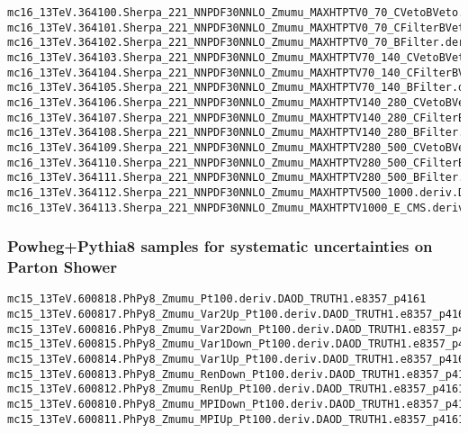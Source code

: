 \begin{tiny}
\begin{verbatim}
mc16_13TeV.364100.Sherpa_221_NNPDF30NNLO_Zmumu_MAXHTPTV0_70_CVetoBVeto.deriv.DAOD_STDM7.e5271_s3126_r10724_p4357
mc16_13TeV.364101.Sherpa_221_NNPDF30NNLO_Zmumu_MAXHTPTV0_70_CFilterBVeto.deriv.DAOD_STDM7.e5271_s3126_r10724_p4357
mc16_13TeV.364102.Sherpa_221_NNPDF30NNLO_Zmumu_MAXHTPTV0_70_BFilter.deriv.DAOD_STDM7.e5271_s3126_r10724_p4357
mc16_13TeV.364103.Sherpa_221_NNPDF30NNLO_Zmumu_MAXHTPTV70_140_CVetoBVeto.deriv.DAOD_STDM7.e5271_s3126_r10724_p4357
mc16_13TeV.364104.Sherpa_221_NNPDF30NNLO_Zmumu_MAXHTPTV70_140_CFilterBVeto.deriv.DAOD_STDM7.e5271_s3126_r10724_p4357
mc16_13TeV.364105.Sherpa_221_NNPDF30NNLO_Zmumu_MAXHTPTV70_140_BFilter.deriv.DAOD_STDM7.e5271_s3126_r10724_p4357
mc16_13TeV.364106.Sherpa_221_NNPDF30NNLO_Zmumu_MAXHTPTV140_280_CVetoBVeto.deriv.DAOD_STDM7.e5271_s3126_r10724_p4357
mc16_13TeV.364107.Sherpa_221_NNPDF30NNLO_Zmumu_MAXHTPTV140_280_CFilterBVeto.deriv.DAOD_STDM7.e5271_s3126_r10724_p4357
mc16_13TeV.364108.Sherpa_221_NNPDF30NNLO_Zmumu_MAXHTPTV140_280_BFilter.deriv.DAOD_STDM7.e5271_s3126_r10724_p4357
mc16_13TeV.364109.Sherpa_221_NNPDF30NNLO_Zmumu_MAXHTPTV280_500_CVetoBVeto.deriv.DAOD_STDM7.e5271_s3126_r10724_p4357
mc16_13TeV.364110.Sherpa_221_NNPDF30NNLO_Zmumu_MAXHTPTV280_500_CFilterBVeto.deriv.DAOD_STDM7.e5271_s3126_r10724_p4357
mc16_13TeV.364111.Sherpa_221_NNPDF30NNLO_Zmumu_MAXHTPTV280_500_BFilter.deriv.DAOD_STDM7.e5271_s3126_r10724_p4357
mc16_13TeV.364112.Sherpa_221_NNPDF30NNLO_Zmumu_MAXHTPTV500_1000.deriv.DAOD_STDM7.e5271_s3126_r10724_p4357
mc16_13TeV.364113.Sherpa_221_NNPDF30NNLO_Zmumu_MAXHTPTV1000_E_CMS.deriv.DAOD_STDM7.e5271_s3126_r10724_p4357
\end{verbatim}
\end{tiny}

\subsubsection{Powheg+Pythia8 samples for systematic uncertainties on Parton Shower}

\begin{tiny}
\begin{verbatim}
mc15_13TeV.600818.PhPy8_Zmumu_Pt100.deriv.DAOD_TRUTH1.e8357_p4161
mc15_13TeV.600817.PhPy8_Zmumu_Var2Up_Pt100.deriv.DAOD_TRUTH1.e8357_p4161
mc15_13TeV.600816.PhPy8_Zmumu_Var2Down_Pt100.deriv.DAOD_TRUTH1.e8357_p4161
mc15_13TeV.600815.PhPy8_Zmumu_Var1Down_Pt100.deriv.DAOD_TRUTH1.e8357_p4161
mc15_13TeV.600814.PhPy8_Zmumu_Var1Up_Pt100.deriv.DAOD_TRUTH1.e8357_p4161
mc15_13TeV.600813.PhPy8_Zmumu_RenDown_Pt100.deriv.DAOD_TRUTH1.e8357_p4161
mc15_13TeV.600812.PhPy8_Zmumu_RenUp_Pt100.deriv.DAOD_TRUTH1.e8357_p4161
mc15_13TeV.600810.PhPy8_Zmumu_MPIDown_Pt100.deriv.DAOD_TRUTH1.e8357_p4161
mc15_13TeV.600811.PhPy8_Zmumu_MPIUp_Pt100.deriv.DAOD_TRUTH1.e8357_p4161

\end{verbatim}
\end{tiny}

